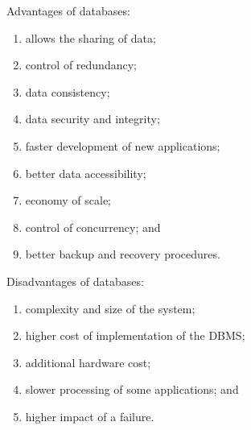 Advantages of databases:
\begin{multicols}{2}
    \begin{enumerate}
        \item allows the sharing of data;
        \item control of redundancy;
        \item data consistency;
        \item data security and integrity;
        \item faster development of new applications;
        \item better data accessibility;
        \item economy of scale;
        \item control of concurrency; and
        \item better backup and recovery procedures.
    \end{enumerate}
\end{multicols}

Disadvantages of databases:
\begin{multicols}{2}
    \begin{enumerate}
        \item complexity and size of the system;
        \item higher cost of implementation of the DBMS;
        \item additional hardware cost;
        \item slower processing of some applications; and
        \item higher impact of a failure.
    \end{enumerate}
\end{multicols}


